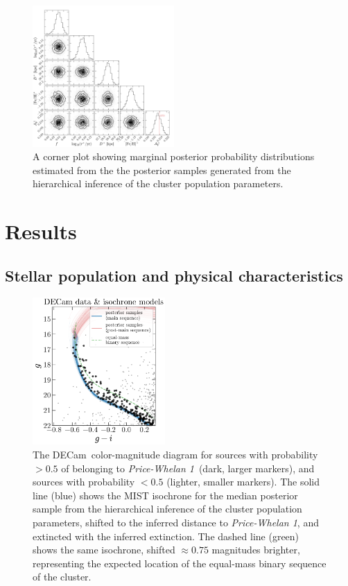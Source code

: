 \documentclass[twocolumn]{aastex62}
\newcommand{\acronym}[1]{{\small{#1}}}
\newcommand{\decam}{DECam}
\newcommand{\clustername}{\textsl{Price-Whelan 1}}
\begin{document}
\begin{figure}
\centering
\includegraphics[width=0.48\textwidth]{figures/hierarch-corner.pdf}
\caption{A corner plot showing marginal posterior probability distributions estimated from the the posterior samples generated from the hierarchical inference of the cluster population parameters.}
\label{fig:hierarch-corner}
\end{figure}


\section{Results} \label{sec:results}

\subsection{Stellar population and physical characteristics}
\label{sec:popchars}

\begin{figure}[htb]
\centering
\includegraphics[width=0.45\textwidth]{figures/hierarch-results.pdf}
\caption{The \decam\ color-magnitude diagram for sources with probability $>0.5$ of belonging to \clustername\ (dark, larger markers), and sources with probability $<0.5$ (lighter, smaller markers).
The solid line (blue) shows the \acronym{MIST} isochrone for the median posterior sample from the hierarchical inference of the cluster population parameters, shifted to the inferred distance to \clustername, and extincted with the inferred extinction.
The dashed line (green) shows the same isochrone, shifted $\approx 0.75$ magnitudes brighter, representing the expected location of the equal-mass binary sequence of the cluster.
}
\label{fig:hierarch-iso}
\end{figure}
\end{document}
